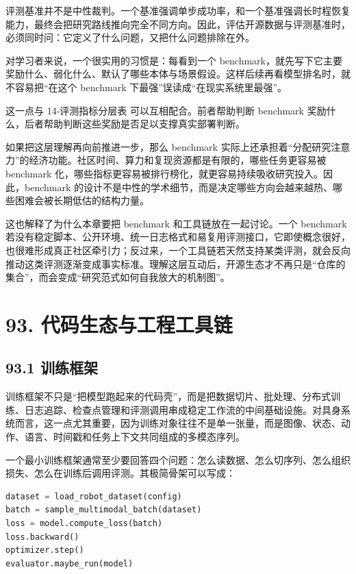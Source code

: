 评测基准并不是中性裁判。一个基准强调单步成功率，和一个基准强调长时程恢复能力，最终会把研究路线推向完全不同方向。因此，评估开源数据与评测基准时，必须同时问：它定义了什么问题，又把什么问题排除在外。

对学习者来说，一个很实用的习惯是：每看到一个 benchmark，就先写下它主要奖励什么、弱化什么、默认了哪些本体与场景假设。这样后续再看模型排名时，就不容易把“在这个 benchmark 下最强”误读成“在现实系统里最强”。

这一点与 14-评测指标分层表 可以互相配合。前者帮助判断 benchmark 奖励什么，后者帮助判断这些奖励是否足以支撑真实部署判断。

如果把这层理解再向前推进一步，那么 benchmark 实际上还承担着“分配研究注意力”的经济功能。社区时间、算力和复现资源都是有限的，哪些任务更容易被 benchmark 化，哪些指标更容易被排行榜化，就更容易持续吸收研究投入。因此，benchmark 的设计不是中性的学术细节，而是决定哪些方向会越来越热、哪些困难会被长期低估的结构力量。

这也解释了为什么本章要把 benchmark 和工具链放在一起讨论。一个 benchmark 若没有稳定脚本、公开环境、统一日志格式和易复用评测接口，它即使概念很好，也很难形成真正社区牵引力；反过来，一个工具链若天然支持某类评测，就会反向推动这类评测逐渐变成事实标准。理解这层互动后，开源生态才不再只是“仓库的集合”，而会变成“研究范式如何自我放大的机制图”。

\section*{93. 代码生态与工程工具链}

\subsection*{93.1 训练框架}


训练框架不只是“把模型跑起来的代码壳”，而是把数据切片、批处理、分布式训练、日志追踪、检查点管理和评测调用串成稳定工作流的中间基础设施。对具身系统而言，这一点尤其重要，因为训练对象往往不是单一张量，而是图像、状态、动作、语言、时间戳和任务上下文共同组成的多模态序列。

一个最小训练框架通常至少要回答四个问题：怎么读数据、怎么切序列、怎么组织损失、怎么在训练后调用评测。其极简骨架可以写成：

\begin{lstlisting}[language=python]
dataset = load_robot_dataset(config)
batch = sample_multimodal_batch(dataset)
loss = model.compute_loss(batch)
loss.backward()
optimizer.step()
evaluator.maybe_run(model)
\end{lstlisting}


